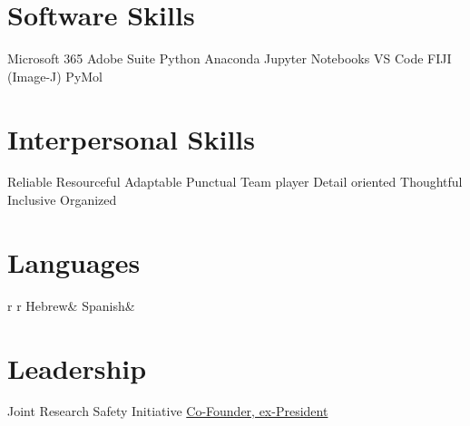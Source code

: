\documentclass[Nunito,custcol]{friggeri-cv}                                       %
\begin{document}




\vspace{-5 mm}

\clearpage

\begin{asidep2}
\section{Software Skills}\vspace{2 mm}
Microsoft 365
Adobe Suite
Python
Anaconda
Jupyter Notebooks
VS Code 
FIJI (Image-J)
PyMol
\section{Interpersonal Skills}\vspace{2 mm}
Reliable
Resourceful
Adaptable
Punctual
Team player
Detail oriented
Thoughtful
Inclusive
Organized
\section{Languages}
\begin{tabular}{r r}
Hebrew&
Spanish&
\end{tabular}\vspace{2 mm}
\section{Leadership}\vspace{2 mm}
Joint Research Safety Initiative \faUsers
\href{https://sites.google.com/chem.ucla.edu/jrsi/home}{Co-Founder, ex-President}
\end{asidep2}
\end{document}
